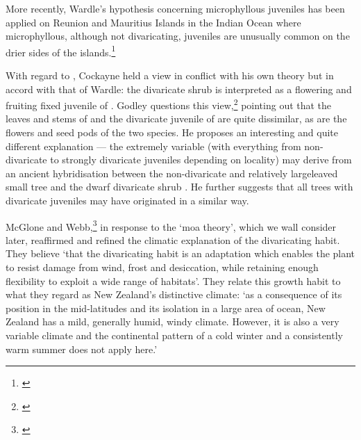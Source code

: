 More recently, Wardle's hypothesis concerning microphyllous juveniles has been applied on Reunion and Mauritius Islands in the Indian Ocean where microphyllous, although not divaricating, juveniles are unusually common on the drier sides of the islands.\footnote{\cite{friedmann1976observations}}

With regard to , Cockayne held a view in conflict with his own theory but in accord with that of Wardle: the divaricate shrub  is interpreted as a flowering and fruiting fixed juvenile of .
Godley questions this view,\footnote{\cite{godley1979leonard}} pointing out that the leaves and stems of  and the divaricate juvenile of  are quite dissimilar, as are the flowers and seed pods of the two species.
He proposes an interesting and quite different explanation — the extremely variable  (with everything from non-divaricate to strongly divaricate juveniles depending on locality) may derive from an ancient hybridisation between the non-divaricate and relatively largeleaved small tree  and the dwarf divaricate shrub .
He further suggests that all trees with divaricate juveniles may have originated in a similar way.

McGlone and Webb,\footnote{\cite{mcglone1981selective}} in response to the `moa theory', which we wall consider later, reaffirmed and refined the climatic explanation of the divaricating habit.
They believe `that the divaricating habit is an adaptation which enables the plant to resist damage from wind, frost and desiccation, while retaining enough flexibility to exploit a wide range of habitats'.
They relate this growth habit to what they regard as New Zealand's distinctive climate: `as a consequence of its position in the mid-latitudes and its isolation in a large area of ocean, New Zealand has a mild, generally humid, windy climate.
However, it is also a very variable climate and the continental pattern of a cold winter and a consistently warm summer does not apply here.'

